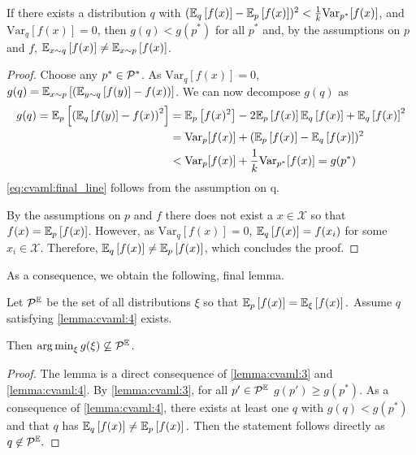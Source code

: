\begin{lemma}\label{lemma:cvaml:4}
    If there exists a distribution $q$ with $(\EEX{q}{f(x)} - \EEX{p}{f(x)})^2 < \frac{1}{k} \mathrm{Var}_{p^*}[f(x)]$, and $\mathrm{Var}_{q}[f(x)] = 0$, then $g(q) < g(p^*)$ for all $p^*$ and, by the assumptions on $p$ and $f$, $\EEX{x\sim q}{f(x)} \neq \EEX{x \sim p}{f(x)}$.
\end{lemma}
\begin{proof}
    Choose any $p^*\in\P^*$. As $\mathrm{Var}_q[f(x)] = 0$, $g(q) = \EEX{x\sim p}{\left(\EEX{y\sim q}{f(y)} - f(x)\right)}$. We can now decompose $g(q)$ as 
    \begin{align}
        g(q) = \EEX{p}{\left(\EEX{q}{f(y)} - f(x)\right)^2} &= \EEX{p}{f(x)^2} - 2\EEX{p}{f(x)}\EEX{q}{f(x)} + \EEX{q}{f(x)}^2 \\
        & = \mathrm{Var}_p[f(x)] + (\EEX{p}{f(x)} - \EEX{q}{f(x)})^2 \\
        &< \mathrm{Var}_p[f(x)] + \frac{1}{k}\mathrm{Var}_{p^*}[f(x)] = g(p^*) \label{eq:cvaml:final_line}
    \end{align}
    \autoref{eq:cvaml:final_line} follows from the assumption on q.
    
    By the assumptions on $p$ and $f$ there does not exist a $x\in\mathcal{X}$ so that $f(x) = \EEX{p}{f(x)}$. However, as $\mathrm{Var}_q[f(x)] = 0$, $\EEX{q}{f(x)} = f(x_i)$ for some $x_i\in\mathcal{X}$. Therefore, $\EEX{q}{f(x)} \neq \EEX{p}{f(x)}$, which concludes the proof.
\end{proof}

As a consequence, we obtain the following, final lemma.

\begin{lemma}\label{lemma:cvaml:5}
    Let $\P^\mathbb{E}$ be the set of all distributions $\xi$ so that $\EEX{p}{f(x)} = \EEX{\xi}{f(x)}.$
    Assume $q$ satisfying \autoref{lemma:cvaml:4} exists.

    Then $\argmin_\xi g(\xi) \not \subseteq \P^\mathbb{E}$.
\end{lemma}

\begin{proof}
    The lemma is a direct consequence of \autoref{lemma:cvaml:3} and \autoref{lemma:cvaml:4}. 
    By \autoref{lemma:cvaml:3}, for all $p' \in \P^\mathbb{E}$ $g(p') \geq g(p^*)$. As a consequence of \autoref{lemma:cvaml:4}, there exists at least one $q$ with $g(q) < g(p^*)$ and that $q$ has $\EEX{q}{f(x)} \neq \EEX{p}{f(x)}.$ Then the statement follows directly as $q \not \in \P^\mathbb{E}.$
\end{proof}


